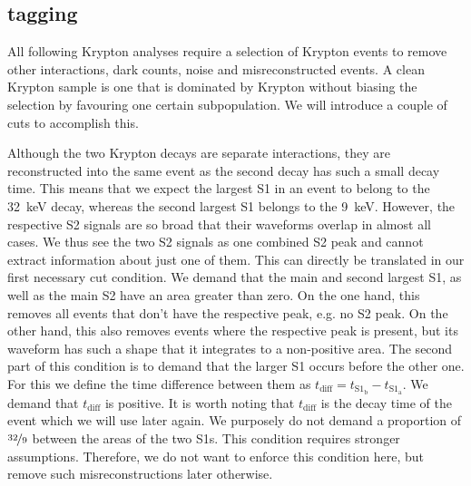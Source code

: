 
\FloatBarrier
\subsection{tagging}
\label{ssec:tagging}
\FloatBarrier


All following Krypton analyses require a selection of Krypton events to remove other interactions, dark counts, noise and misreconstructed events.
A clean Krypton sample is one that is dominated by Krypton without biasing the selection by favouring one certain subpopulation.
We will introduce a couple of cuts to accomplish this.


Although the two Krypton decays are separate interactions, they are reconstructed into the same event as the second decay has such a small decay time.
This means that we expect the largest S1 in an event to belong to the \SI{32}{\kilo\eV} decay, whereas the second largest S1 belongs to the \SI{9}{\kilo\eV}.
However, the respective S2 signals are so broad that their waveforms overlap in almost all cases.
We thus see the two S2 signals as one combined S2 peak and cannot extract information about just one of them.
This can directly be translated in our first necessary cut condition.
We demand that the main and second largest S1, as well as the main S2 have an area greater than zero.
On the one hand, this removes all events that don't have the respective peak, e.g. no S2 peak.
On the other hand, this also removes events where the respective peak is present, but its waveform has such a shape that it integrates to a non-positive area.
The second part of this condition is to demand that the larger S1 occurs before the other one.
For this we define the time difference between them as $t_\mathrm{diff} = t_{\mathrm{S}1_\mathrm{b}} - t_{\mathrm{S}1_\mathrm{a}}$.
We demand that $t_\mathrm{diff}$ is positive.
It is worth noting that $t_\mathrm{diff}$ is the decay time of the event which we will use later again.
We purposely do not demand a proportion of $ \nicefrac{32}{9} $ between the areas of the two S1s.
This condition requires stronger assumptions.
Therefore, we do not want to enforce this condition here, but remove such misreconstructions later otherwise.


